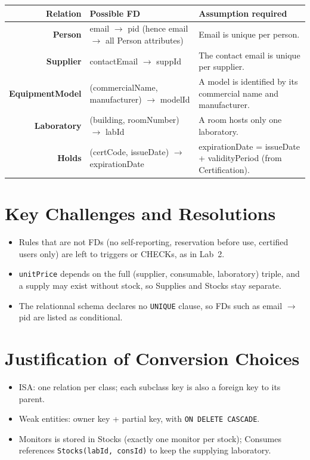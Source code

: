 \documentclass[11pt,a4paper]{article}
\newcommand{\fd}{\ensuremath{\rightarrow}}
\newcommand{\rel}[1]{\textbf{#1}}
\begin{document}
\begin{longtable}{R F J}
\toprule
\textbf{Relation} & \textbf{Possible FD} & \textbf{Assumption required}\\
\midrule
\endhead
\rel{Person} & email \fd{} pid (hence email \fd{} all Person attributes) & Email is unique per person.\\
\rel{Supplier} & contactEmail \fd{} suppId & The contact email is unique per supplier.\\
\rel{EquipmentModel} & (commercialName, manufacturer) \fd{} modelId & A model is identified by its commercial name and manufacturer.\\
\rel{Laboratory} & (building, roomNumber) \fd{} labId & A room hosts only one laboratory.\\
\rel{Holds} & (certCode, issueDate) \fd{} expirationDate & expirationDate = issueDate + validityPeriod (from Certification).\\
\bottomrule
\end{longtable}

\section{Key Challenges and Resolutions}
\begin{itemize}
  \item Rules that are not FDs (no self-reporting, reservation before use, certified users only) are left to triggers or CHECKs, as in Lab~2.
  \item \texttt{unitPrice} depends on the full (supplier, consumable, laboratory) triple, and a supply may exist without stock, so Supplies and Stocks stay separate.
  \item The relationnal schema declares no \texttt{UNIQUE} clause, so FDs such as email \fd{} pid are listed as conditional.
\end{itemize}

\section{Justification of Conversion Choices}
\begin{itemize}
  \item ISA: one relation per class; each subclass key is also a foreign key to its parent.
  \item Weak entities: owner key + partial key, with \texttt{ON DELETE CASCADE}.
  \item Monitors is stored in Stocks (exactly one monitor per stock); Consumes references \texttt{Stocks(labId, consId)} to keep the supplying laboratory.
\end{itemize}
\end{document}
